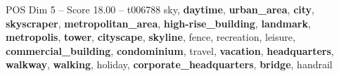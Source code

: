 \begin{textsample}{POS Dim 5 – Score 18.00 – t006788}  \label{ex:f5_pos_018}
sky, \textbf{daytime}, \textbf{urban\_area}, \textbf{city}, \textbf{skyscraper}, \textbf{metropolitan\_area}, \textbf{high-rise\_building}, \textbf{landmark}, \textbf{metropolis}, \textbf{tower}, \textbf{cityscape}, \textbf{skyline}, fence, recreation, leisure, \textbf{commercial\_building}, \textbf{condominium}, travel, \textbf{vacation}, \textbf{headquarters}, \textbf{walkway}, \textbf{walking}, holiday, \textbf{corporate\_headquarters}, \textbf{bridge}, handrail

\end{textsample}
